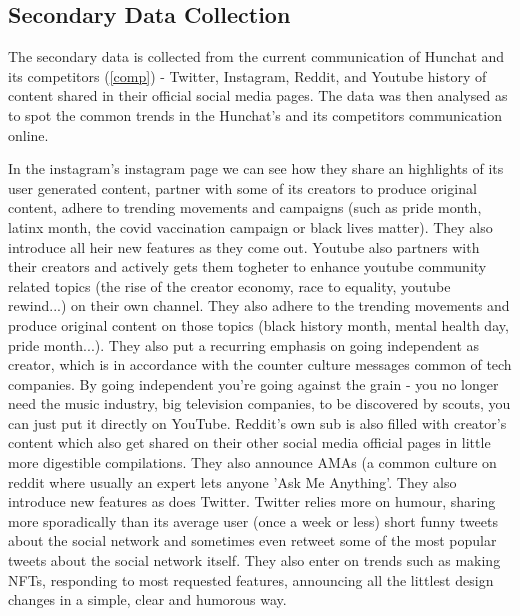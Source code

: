 \documentclass[12pt]{article}
\begin{document}
\subsection{Secondary Data Collection}
The secondary data is collected from the current communication of Hunchat and its competitors  (\ref{comp}) - Twitter, Instagram, Reddit, and Youtube history of content shared in their official social media pages. The data was then analysed as to spot the common trends in the Hunchat's and its competitors communication online. 

In the instagram's instagram page we can see how they share an highlights of its user generated content, partner with some of its creators to produce original content, adhere to trending movements and campaigns (such as pride month, latinx month, the covid vaccination campaign or black lives matter). They also introduce all heir new features as they come out. Youtube also partners with their creators and actively gets them togheter to enhance youtube community related topics (the rise of the creator economy, race to equality, youtube rewind...) on their own channel. They also adhere to the trending movements and produce original content on those topics (black history month, mental health day, pride month...). They also put a recurring emphasis on going independent as creator, which is in accordance with the counter culture messages common of tech companies. By going independent you're going against the grain - you no longer need the music industry, big television companies, to be discovered by scouts, you can just put it directly on YouTube. Reddit's own sub is also filled with creator's content which also get shared on their other social media official pages in little more digestible compilations. They also announce AMAs (a common culture on reddit where usually an expert lets anyone 'Ask Me Anything'. They also introduce new features as does Twitter. Twitter relies more on humour, sharing more sporadically than its average user (once a week or less) short funny tweets about the social network  and sometimes even retweet some of the most popular tweets about the social network itself. They also enter on trends such as making NFTs, responding to most requested features, announcing all the littlest design changes in a simple, clear and humorous way.
\end{document}
